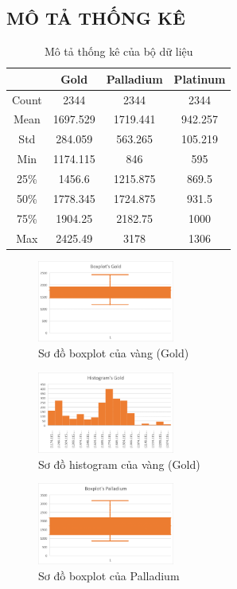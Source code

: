 \subsection{MÔ TẢ THỐNG KÊ}
\begin{table}[H]
  \centering
\begin{tabular}{|c|c|c|c|}
    \hline
     \  & Gold & Palladium & Platinum \\ \hline
     Count & 2344 & 2344 & 2344\\ \hline
     Mean & 1697.529 & 1719.441 & 942.257\\ \hline
     Std & 284.059 & 563.265 & 105.219\\ \hline
     Min & 1174.115 & 846 & 595\\ \hline
     25\% & 1456.6 & 1215.875 & 869.5\\ \hline
     50\% & 1778.345 & 1724.875 & 931.5\\ \hline
     75\% & 1904.25 & 2182.75 & 1000\\ \hline
     Max & 2425.49 & 3178 & 1306\\ \hline
\end{tabular}
\caption{Mô tả thống kê của bộ dữ liệu}
\end{table}

\begin{figure}[H]
\centerline{\includegraphics[width=0.4\textwidth]{img/Picture2.png}}
\caption{Sơ đồ boxplot của vàng (Gold)}
\label{fig}
\end{figure}

\begin{figure}[H]
\centerline{\includegraphics[width=0.4\textwidth]{img/Picture5.png}}
\caption{Sơ đồ histogram của vàng (Gold)}
\label{fig}
\end{figure}

\begin{figure}[H]
\centerline{\includegraphics[width=0.4\textwidth]{img/Picture3.png}}
\caption{Sơ đồ boxplot của Palladium}
\label{fig}
\end{figure}

